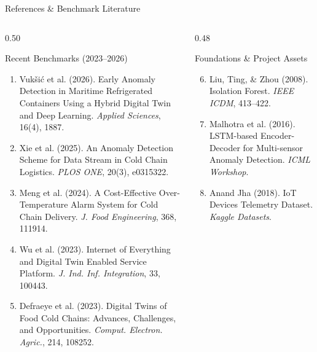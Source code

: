 \documentclass[aspectratio=169, 10pt]{beamer}
\begin{document}
\begin{frame}{References \& Benchmark Literature}
    \begin{columns}[T]
        \begin{column}{0.50\textwidth}
            \begin{block}{Recent Benchmarks (2023--2026)}
                \tiny
                \begin{enumerate}
                    \item Vuk\v{s}i\'{c} et al. (2026). Early Anomaly Detection in Maritime Refrigerated Containers Using a Hybrid Digital Twin and Deep Learning. \textit{Applied Sciences}, 16(4), 1887.
                    \item Xie et al. (2025). An Anomaly Detection Scheme for Data Stream in Cold Chain Logistics. \textit{PLOS ONE}, 20(3), e0315322.
                    \item Meng et al. (2024). A Cost-Effective Over-Temperature Alarm System for Cold Chain Delivery. \textit{J. Food Engineering}, 368, 111914.
                    \item Wu et al. (2023). Internet of Everything and Digital Twin Enabled Service Platform. \textit{J. Ind. Inf. Integration}, 33, 100443.
                    \item Defraeye et al. (2023). Digital Twins of Food Cold Chains: Advances, Challenges, and Opportunities. \textit{Comput. Electron. Agric.}, 214, 108252.
                \end{enumerate}
            \end{block}
        \end{column}
        \begin{column}{0.48\textwidth}
            \begin{exampleblock}{Foundations \& Project Assets}
                \tiny
                \begin{enumerate}
                    \setcounter{enumi}{5}
                    \item Liu, Ting, \& Zhou (2008). Isolation Forest. \textit{IEEE ICDM}, 413--422.
                    \item Malhotra et al. (2016). LSTM-based Encoder-Decoder for Multi-sensor Anomaly Detection. \textit{ICML Workshop}.
                    \item Anand Jha (2018). IoT Devices Telemetry Dataset. \textit{Kaggle Datasets}.

\end{enumerate}
\end{exampleblock}
\end{column}
\end{columns}
\end{frame}
\end{document}
